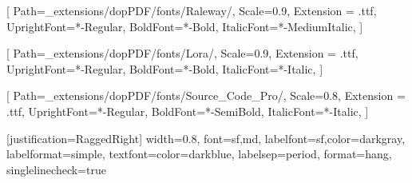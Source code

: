 \usepackage{microtype} %
\usepackage{wrapfig} %
\usepackage[document]{ragged2e} %

\setsansfont{Raleway}[
    Path=_extensions/dopPDF/fonts/Raleway/,
    Scale=0.9,
    Extension = .ttf,
    UprightFont=*-Regular,
    BoldFont=*-Bold,
    ItalicFont=*-MediumItalic,
    ]

\setmainfont{Lora}[
    Path=_extensions/dopPDF/fonts/Lora/,
    Scale=0.9,
    Extension = .ttf,
    UprightFont=*-Regular,
    BoldFont=*-Bold,
    ItalicFont=*-Italic,
    ]


\setmonofont{SourceCodePro}[
    Path=_extensions/dopPDF/fonts/Source_Code_Pro/,
    Scale=0.8,
    Extension = .ttf,
    UprightFont=*-Regular,
    BoldFont=*-SemiBold,
    ItalicFont=*-Italic,
    ]


\chapterfont{\color{lightblue}\fontsize{24}{16.8}\selectfont}
\sectionfont{\color{darkestblue}\fontsize{26}{16.8}\selectfont}
\subsectionfont{\color{darkblue}\fontsize{20}{2}\selectfont}
\subsubsectionfont{\color{darkestblue}\fontsize{16}{16.8}\selectfont}

\allsectionsfont{\sffamily}

\RequirePackage{caption}
[justification=RaggedRight]
{
 width=0.8\textwidth,
  font={sf,md},
  labelfont={sf,color=darkgray},
  labelformat=simple,
  textfont={color=darkblue},
  labelsep=period,
  format=hang,
  singlelinecheck=true
}
\captionsetup[figure]{aboveskip=6pt,style=dopCaption}

